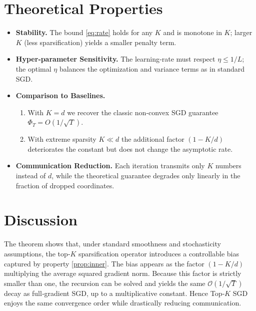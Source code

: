 \documentclass{article}
\begin{document}
\section*{Theoretical Properties}
\begin{itemize}[nosep]
  \item \textbf{Stability.} The bound \eqref{eq:rate} holds for any \(K\) and is monotone in \(K\); larger \(K\) (less sparsification) yields a smaller penalty term.
  \item \textbf{Hyper‑parameter Sensitivity.} The learning‑rate must respect \(\eta\le 1/L\); the optimal \(\eta\) balances the optimization and variance terms as in standard SGD.
  \item \textbf{Comparison to Baselines.}
  \begin{enumerate}[nosep]
    \item With \(K=d\) we recover the classic non‑convex SGD guarantee \(\Phi_T = O(1/\sqrt{T})\).
    \item With extreme sparsity \(K\ll d\) the additional factor \((1-K/d)\) deteriorates the constant but does not change the asymptotic rate.
  \end{enumerate}
  \item \textbf{Communication Reduction.} Each iteration transmits only \(K\) numbers instead of \(d\), while the theoretical guarantee degrades only linearly in the fraction of dropped coordinates.
\end{itemize}

\section*{Discussion}
The theorem shows that, under standard smoothness and stochasticity assumptions, the top‑\(K\) sparsification operator introduces a controllable bias captured by property \eqref{prop:inner}. The bias appears as the factor \((1-K/d)\) multiplying the average squared gradient norm. Because this factor is strictly smaller than one, the recursion can be solved and yields the same \(\mathcal{O}(1/\sqrt{T})\) decay as full‑gradient SGD, up to a multiplicative constant. Hence Top‑\(K\) SGD enjoys the same convergence order while drastically reducing communication.

\newpage
\end{document}
